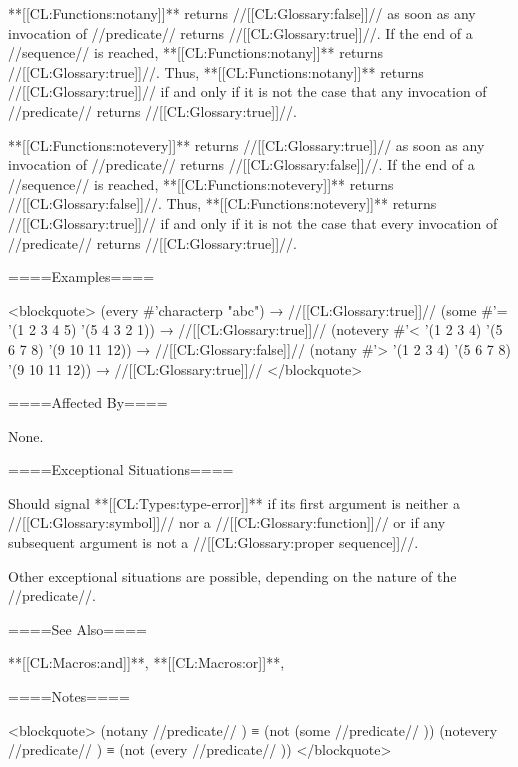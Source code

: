 **[[CL:Functions:notany]]** returns //[[CL:Glossary:false]]// as soon as any invocation of //predicate// returns //[[CL:Glossary:true]]//. If the end of a //sequence// is reached, **[[CL:Functions:notany]]** returns //[[CL:Glossary:true]]//. Thus, **[[CL:Functions:notany]]** returns //[[CL:Glossary:true]]// if and only if it is not the case that any invocation of //predicate// returns //[[CL:Glossary:true]]//.

**[[CL:Functions:notevery]]** returns //[[CL:Glossary:true]]// as soon as any invocation of //predicate// returns //[[CL:Glossary:false]]//. If the end of a //sequence// is reached, **[[CL:Functions:notevery]]** returns //[[CL:Glossary:false]]//. Thus, **[[CL:Functions:notevery]]** returns //[[CL:Glossary:true]]// if and only if it is not the case that every invocation of //predicate// returns //[[CL:Glossary:true]]//.

====Examples====

<blockquote> (every #'characterp "abc") → //[[CL:Glossary:true]]// (some #'= '(1 2 3 4 5) '(5 4 3 2 1)) → //[[CL:Glossary:true]]// (notevery #'< '(1 2 3 4) '(5 6 7 8) '(9 10 11 12)) → //[[CL:Glossary:false]]// (notany #'> '(1 2 3 4) '(5 6 7 8) '(9 10 11 12)) → //[[CL:Glossary:true]]// </blockquote>

====Affected By====

None.

====Exceptional Situations====

Should signal **[[CL:Types:type-error]]** if its first argument is neither a //[[CL:Glossary:symbol]]// nor a //[[CL:Glossary:function]]// or if any subsequent argument is not a //[[CL:Glossary:proper sequence]]//.

Other exceptional situations are possible, depending on the nature of the //predicate//.

====See Also====

**[[CL:Macros:and]]**, **[[CL:Macros:or]]**,

{\secref\TraversalRules}

====Notes====

<blockquote> (notany //predicate// ) ≡ (not (some //predicate// )) (notevery //predicate// ) ≡ (not (every //predicate// )) </blockquote>

